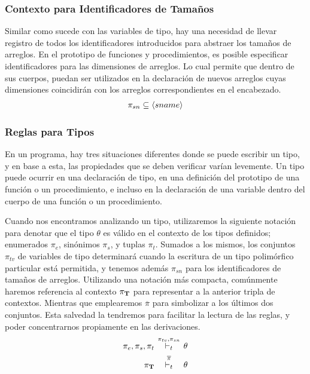 \subsubsection{Contexto para Identificadores de Tamaños}

Similar como sucede con las variables de tipo, hay una necesidad de llevar registro de todos los identificadores introducidos para abstraer los tamaños de arreglos.
En el prototipo de funciones y procedimientos, es posible especificar identificadores para las dimensiones de arreglos.
Lo cual permite que dentro de sus cuerpos, puedan ser utilizados en la declaración de nuevos arreglos cuyas dimensiones coincidirán con los arreglos correspondientes en el encabezado.
\begin{gather*}
\pi_{sn} \subseteq \langle sname \rangle
\end{gather*}

\subsubsection{Reglas para Tipos}

En un programa, hay tres situaciones diferentes donde se puede escribir un tipo, y en base a esta, las propiedades que se deben verificar varían levemente.
Un tipo puede ocurrir en una declaración de tipo, en una definición del prototipo de una función o un procedimiento, e incluso en la declaración de una variable dentro del cuerpo de una función o un procedimiento.

Cuando nos encontramos analizando un tipo, utilizaremos la siguiente notación para denotar que el tipo $\theta$ es válido en el contexto de los tipos definidos; enumerados $\pi_{e}$, sinónimos $\pi_{s}$, y tuplas $\pi_{t}$.
Sumados a los mismos, los conjuntos $\pi_{tv}$ de variables de tipo determinará cuando la escritura de un tipo polimórfico particular está permitida, y tenemos además $\pi_{sn}$ para los identificadores de tamaños de arreglos.
Utilizando una notación más compacta, comúnmente haremos referencia al contexto $\pi_{\mathbf{T}}$ para representar a la anterior tripla de contextos.
Mientras que emplearemos $\overline{\pi}$ para simbolizar a los últimos dos conjuntos.
Esta salvedad la tendremos para facilitar la lectura de las reglas, y poder concentrarnos propiamente en las derivaciones.
\begin{align*}
\pi_{e}, \pi_{s}, \pi_{t}
\quad
&\DASH[\mathclap{\pi_{tv}, \pi_{sn}}]{t}
\quad
\theta
\\
\PI{T}
\quad
&\DASH[\overline{\pi}]{t}
\quad
\theta
\end{align*}

